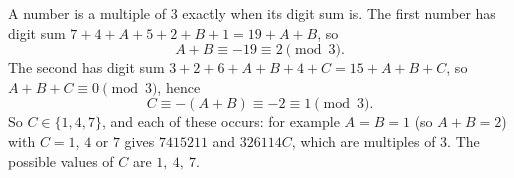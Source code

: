 A number is a multiple of $3$ exactly when its digit sum is. The first number has digit sum $7+4+A+5+2+B+1=19+A+B$, so
\[A+B\equiv-19\equiv2\pmod 3.\]
The second has digit sum $3+2+6+A+B+4+C=15+A+B+C$, so $A+B+C\equiv0\pmod3$, hence
\[C\equiv-(A+B)\equiv-2\equiv1\pmod3.\]
So $C\in\{1,4,7\}$, and each of these occurs: for example $A=B=1$ (so $A+B=2$) with $C=1$, $4$ or $7$ gives $7415211$ and $326114C$, which are multiples of $3$. The possible values of $C$ are $\boxed{1,\ 4,\ 7}$.
